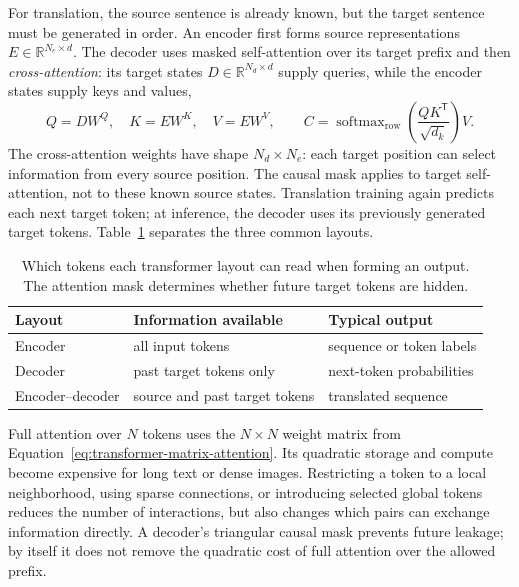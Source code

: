 For translation, the source sentence is already known, but the target sentence
must be generated in order. An encoder first forms source representations
$E\in\mathbb R^{N_e\times d}$. The decoder uses masked self-attention over its
target prefix and then \emph{cross-attention}: its target states
$D\in\mathbb R^{N_d\times d}$ supply queries, while the encoder states supply
keys and values,
\begin{equation}
  Q=DW^Q,\quad K=EW^K,\quad V=EW^V,\qquad
  C=\operatorname{softmax}_{\mathrm{row}}\!\left(
       \frac{QK^{\mathsf T}}{\sqrt{d_k}}\right)V.
  \label{eq:transformer-cross-attention}
\end{equation}
\noindent
The cross-attention weights have shape $N_d\times N_e$: each target position
can select information from every source position. The causal mask applies to
target self-attention, not to these known source states. Translation training
again predicts each next target token; at inference, the decoder uses its
previously generated target tokens. Table~\ref{tab:transformer-roles} separates
the three common layouts.

\begin{table}[ht]
  \centering
  \begin{tabular}{@{}p{3.0cm}p{5.5cm}p{4.9cm}@{}}
    \toprule
    Layout & Information available & Typical output \\
    \midrule
    Encoder & all input tokens & sequence or token labels \\
    Decoder & past target tokens only & next-token probabilities \\
    Encoder--decoder & source and past target tokens & translated sequence \\
    \bottomrule
  \end{tabular}
  \caption{Which tokens each transformer layout can read when forming an
  output. The attention mask determines whether future target tokens are
  hidden.}
  \label{tab:transformer-roles}
\end{table}

\noindent
Full attention over $N$ tokens uses the $N\times N$ weight matrix from
Equation~\ref{eq:transformer-matrix-attention}. Its quadratic storage and
compute become expensive for long text or dense images. Restricting a token to
a local neighborhood, using sparse connections, or introducing selected global
tokens reduces the number of interactions, but also changes which pairs can
exchange information directly. A decoder's triangular causal mask prevents
future leakage; by itself it does not remove the quadratic cost of full
attention over the allowed prefix.

